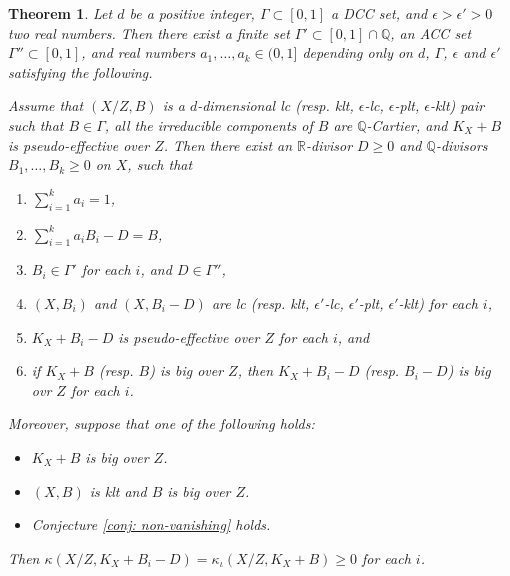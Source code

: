 \documentclass[11pt]{amsart}
\numberwithin{equation}{section}
\newcommand{\Qq}{\mathbb{Q}}
\newcommand{\Rr}{\mathbb{R}}
\newcommand{\Ii}{{\Gamma}}
\newtheorem{thm}{Theorem}[section]
\theoremstyle{definition}
\theoremstyle{definition}
\begin{document}
\begin{thm}\label{thm:dccdecomp1}
Let $d$ be a positive integer, $\Ii\subset[0,1]$ a DCC set, and $\epsilon>\epsilon'>0$ two real numbers. Then there exist a finite set $\Ii'\subset[0,1]\cap\Qq$, an ACC set $\Ii''\subset[0,1]$, and real numbers $a_1,\dots,a_k\in (0,1]$ depending only on $d$, $\Ii$, $\epsilon$ and $\epsilon'$ satisfying the following. 

Assume that $(X/Z,B)$ is a $d$-dimensional lc (resp. klt, $\epsilon$-lc, $\epsilon$-plt, $\epsilon$-klt) pair such that $B\in\Ii$, all the irreducible components of $B$ are $\Qq$-Cartier, and $K_X+B$ is pseudo-effective over $Z$. Then there exist an $\Rr$-divisor $D\geq 0$ and $\Qq$-divisors $B_1,\dots,B_k\geq 0$ on $X$, such that 
\begin{enumerate}
    \item $\sum_{i=1}^ka_i=1$,
    \item $\sum_{i=1}^ka_iB_i-D=B$,
    \item $B_i\in\Ii'$ for each $i$, and $D\in\Ii''$,
    \item $(X,B_i)$ and $(X,B_i-D)$ are lc (resp. klt, $\epsilon'$-lc, $\epsilon'$-plt,
    $\epsilon'$-klt) for each $i$, 
    \item $K_X+B_i-D$ is pseudo-effective over $Z$ for each $i$, and
    \item if $K_X+B$ (resp. $B$) is big over $Z$, then $K_X+B_i-D$ (resp. $B_i-D$) is big ovr $Z$ for each $i$.
\end{enumerate}
Moreover, suppose that one of the following holds:
\begin{itemize}
  \item $K_X+B$ is big over $Z$.
  \item $(X,B)$ is klt and $B$ is big over $Z$.
  \item Conjecture \ref{conj: non-vanishing} holds.
\end{itemize}
Then $\kappa(X/Z,K_X+B_i-D)=\kappa_{\iota}(X/Z,K_X+B)\geq 0$ for each $i$.
\end{thm}
\end{document}
